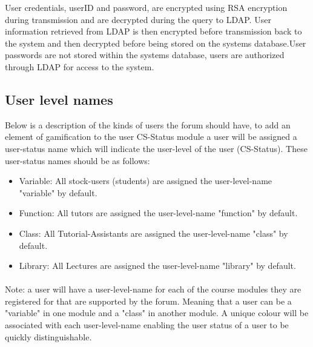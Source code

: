 \documentclass[12pt]{article}
\begin{document}
\smallskip

\par{User credentials, userID and password, are encrypted using RSA encryption during transmission and are decrypted during the query to LDAP. User information retrieved from LDAP is then encrypted before transmission back to the system and then decrypted before being stored on the systems database.User passwords are not stored within the systems database, users are authorized through LDAP for access to the system. }

\newpage
\subsection*{User level names}
\par{Below is a description of the kinds of users the forum should have, to add an element of gamification to the user CS-Status module a user will be assigned a user-status name which will indicate the user-level of the user (CS-Status). These user-status names should be as follows: }
\begin{itemize}
\item Variable: All stock-users (students) are assigned the user-level-name "variable" by default.
\item Function: All tutors are assigned the user-level-name "function" by default.
\item Class: All Tutorial-Assistants are assigned the user-level-name "class" by default.
\item Library: All Lectures are assigned the user-level-name "library" by default.
\end{itemize}

\paragraph*{}{Note: a user will have a user-level-name for each of the course modules they are registered for that are supported by the forum. Meaning that a user can be a "variable" in one module and a "class" in another module. A unique colour will be associated with each user-level-name enabling the user status of a user to be quickly distinguishable.}



\newpage


\newpage


\newpage

\newpage
\end{document}
